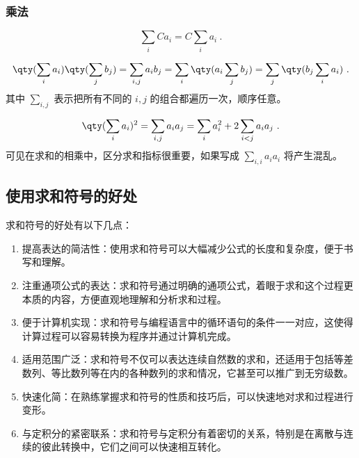 \subsubsection{乘法}
\begin{equation}
\sum_i C a_i = C\sum_i a_i~.
\end{equation}

\begin{equation}
\qty(\sum_i a_i) \qty(\sum_j b_j) = \sum_{i,j} a_i b_j = \sum_i \qty(a_i \sum_j b_j) = \sum_j \qty(b_j \sum_i a_i)~.
\end{equation}
其中 $\sum\limits_{i,j}$ 表示把所有不同的 $i,j$ 的组合都遍历一次，顺序任意。

\begin{equation}
\qty(\sum_i a_i)^2 = \sum_{i,j} a_i a_j = \sum_i a_i^2 + 2\sum_{i<j} a_i a_j~.
\end{equation}
可见在求和的相乘中，区分求和指标很重要，如果写成 $\sum\limits_{i,i} a_i a_i$ 将产生混乱。

\subsection{使用求和符号的好处}

求和符号的好处有以下几点：
\begin{enumerate}
\item 提高表达的简洁性：使用求和符号可以大幅减少公式的长度和复杂度，便于书写和理解。
\item 注重通项公式的表达：求和符号通过明确的通项公式，着眼于求和这个过程更本质的内容，方便直观地理解和分析求和过程。
\item 便于计算机实现：求和符号与编程语言中的循环语句的条件一一对应，这使得计算过程可以容易转换为程序并通过计算机完成。
\item 适用范围广泛：求和符号不仅可以表达连续自然数的求和，还适用于包括等差数列、等比数列等在内的各种数列的求和情况，它甚至可以推广到无穷级数。
\item 快速化简：在熟练掌握求和符号的性质和技巧后，可以快速地对求和过程进行变形。
\item 与定积分的紧密联系：求和符号与定积分有着密切的关系，特别是在离散与连续的彼此转换中，它们之间可以快速相互转化。
\end{enumerate}